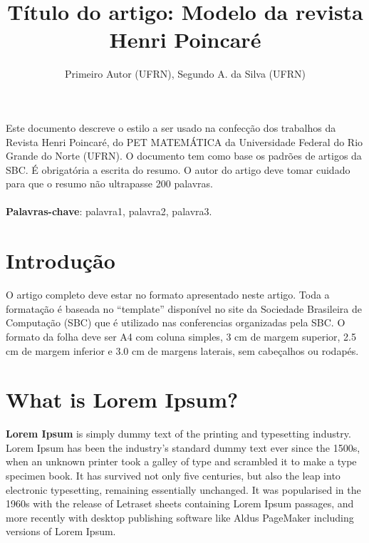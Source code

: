 \documentclass[12pt]{article}
\title{Título do artigo: Modelo da revista Henri Poincaré}
\author{Primeiro Autor (UFRN)\inst{1}, Segundo A. da Silva (UFRN)\inst{2}}
\begin{document}
 
\maketitle

\begin{resumo}
  Este documento descreve o estilo a ser usado na confecção dos trabalhos da Revista Henri Poincaré, do PET MATEMÁTICA da Universidade Federal do Rio Grande do Norte (UFRN). O documento tem como base os padrões de artigos da SBC. É obrigatória a escrita do resumo. O autor do artigo deve tomar cuidado para que o resumo não ultrapasse 200 palavras.\\ \\
  \textbf{Palavras-chave}: palavra1, palavra2, palavra3.
\end{resumo}

\section{Introdução}
O artigo completo deve estar no formato apresentado neste artigo. Toda a formatação é baseada no “template” disponível no site da Sociedade Brasileira de Computação (SBC) que é utilizado nas conferencias organizadas pela SBC. O formato da folha deve ser A4 com coluna simples, 3 cm de margem superior, 2.5 cm de margem inferior e 3.0 cm de margens laterais, sem cabeçalhos ou rodapés. 


\section{What is Lorem Ipsum?} \label{sec:firstpage}

\textbf{Lorem Ipsum} is simply dummy text of the printing and typesetting industry. Lorem Ipsum has been the industry's standard dummy text ever since the 1500s, when an unknown printer took a galley of type and scrambled it to make a type specimen book. It has survived not only five centuries, but also the leap into electronic typesetting, remaining essentially unchanged. It was popularised in the 1960s with the release of Letraset sheets containing Lorem Ipsum passages, and more recently with desktop publishing software like Aldus PageMaker including versions of Lorem Ipsum.
\end{document}
